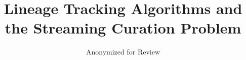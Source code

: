 \title{ Lineage Tracking Algorithms and the Streaming Curation Problem }
\author{
    Anonymized for Review
}
\date{}

\newcommand{\affil}[1]{\textsuperscript{#1}}

\maketitle



